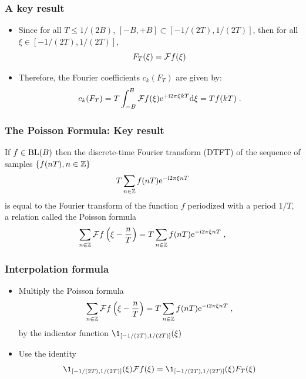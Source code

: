 \begin{frame}
\frametitle{A key result}
\begin{itemize}
\item Since for all $T \leq 1/(2B)$, $[-B,+B] \subset [-1/(2T), 1/(2T)]$, then for all $\xi \in [-1/(2T),1/(2T)]$,
\alert{
$$F_T(\xi) = \mathcal{F} f(\xi) $$
}
\item Therefore, the  Fourier coefficients $c_k(F_T)$ are given by:
\alert{
\begin{equation*}
c_k(F_T) = T \int_{-B}^{B} \mathcal{F} f(\xi) \mathrm{e}^{+ \mathrm{i} 2 \pi \xi k T} \mathrm{d} \xi= T f(kT)\;.
\end{equation*}
}
\end{itemize}
\end{frame}



\begin{frame}
\frametitle{The Poisson Formula: Key result}
If $f \in \mathrm{BL}(B)$ then the \alert{discrete-time Fourier transform} (DTFT) of the sequence of samples $\{ f(nT), n \in \mathbb{Z} \}$
\[
T \sum_{n \in \mathbb{Z}} f(nT) \mathrm{e}^{- \mathrm{i} 2 \pi \xi n T}
\]
is equal to the Fourier transform of the function $f$ periodized with a period $1/T$, a relation called the \alert{Poisson formula}
\begin{equation*}
\label{eq:FormuleSommatoirePoisson}
\sum_{n \in \mathbb{Z}} \mathcal{F} f \left( \xi - \frac{n}{T} \right)  = T \sum_{n \in \mathbb{Z}} f(nT) \mathrm{e}^{- \mathrm{i} 2 \pi \xi n T}\;,
\end{equation*}
\end{frame}

\begin{frame}
\frametitle{Interpolation formula}
\begin{itemize}
\item \alert<1>{Multiply the Poisson formula
\begin{equation*}
\sum_{n \in \mathbb{Z}} \mathcal{F} f \left( \xi - \frac{n}{T} \right)  = T \sum_{n \in \mathbb{Z}} f(nT) \mathrm{e}^{- \mathrm{i} 2 \pi \xi n T}\;,
\end{equation*}
by the indicator function $\1_{[-1/(2T),1/(2T)]}(\xi)$}
\item \alert<2>{Use the identity $$\1_{[-1/(2T),1/(2T)]}(\xi) \TF f (\xi)= \1_{[-1/(2T),1/(2T)]}(\xi) F_T(\xi)$$}
\end{itemize}

\end{frame}

